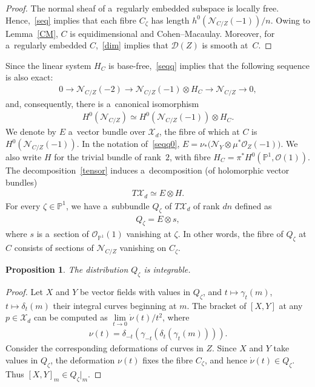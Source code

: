 \documentclass[pdftex]{sigma}
\numberwithin{equation}{section}
\newtheorem{Proposition}[Theorem]{Proposition}
{\theoremstyle{definition}
\newtheorem{Definition}[Theorem]{Definition}
\newtheorem{Remark}[Theorem]{Remark}
}
\begin{document}
\begin{proof}
The normal sheaf of a~regularly embedded subspace is locally free.
Hence,~\eqref{seq} implies that each f\/ibre $C_\zeta$ has length $h^0( {\mathcal{N}}_{C/Z}(-1))/n$.
Owing to Lemma~\ref{CM}, $C$ is equidimensional and Cohen--Macaulay.
Moreover, for a~regularly embedded $C$,~\eqref{dim} implies that ${\mathcal{D}}(Z)$ is smooth at~$C$.
\end{proof}

Since the linear system $H_C$ is base-free,~\eqref{seqq} implies that the following sequence is also exact:
\begin{gather*}
0\to {\mathcal{N}}_{C/Z}(-2)\to {\mathcal{N}}_{C/Z}(-1)\otimes H_C\to {\mathcal{N}}_{C/Z}\to 0,
\end{gather*}
and, consequently, there is a~canonical isomorphism
\begin{gather}
H^0({\mathcal{N}}_{C/Z})\simeq H^0({\mathcal{N}}_{C/Z}(-1))\otimes H_C.
\label{tensor}
\end{gather}
We denote by $E$ a~vector bundle over ${\mathcal{X}}_d$, the f\/ibre of which at $C$ is $H^0({\mathcal{N}}_{C/Z}(-1))$.
In the notation of~\eqref{seqq0}, $E= \nu_\ast\bigl({\mathcal{N}}_Y\otimes \mu^\ast{\mathcal{O}}_Z(-1)\bigr)$.
We also write $H$ for the trivial bundle of rank~$2$, with f\/ibre $H_C=\pi^\ast H^0({\mathbb{P}}^1,{\mathcal{O}}(1))$.
The decomposition~\eqref{tensor} induces a~decomposition (of holomorphic vector bundles)
\begin{gather*}
T{\mathcal{X}}_d\simeq E\otimes H.
\end{gather*}
For every $\zeta\in {\mathbb{P}}^1$, we have a~subbundle $Q_\zeta$ of $T{\mathcal{X}}_d$ of rank $dn$ def\/ined as
\begin{gather*}
Q_\zeta=E\otimes s,
\end{gather*}
where $s$ is a~section of ${\mathcal{O}}_{{\mathbb{P}}^1}(1)$ vanishing at $\zeta$.
In other words, the f\/ibre of $Q_\zeta$ at $C$ consists of sections of ${\mathcal{N}}_{C/Z}$ vanishing on $C_\zeta$.

\begin{Proposition}\label{integr}
The distribution $Q_\zeta$ is integrable.
\end{Proposition}

\begin{proof}
Let $X$ and $Y$ be vector f\/ields with values in $Q_\zeta$, and $t\mapsto\gamma_t(m)$, $t\mapsto \delta_t(m)$ their
integral curves beginning at $m$.
The bracket of $[X,Y]$ at any $p\in {\mathcal{X}}_d$ can be computed as $\lim\limits_{t\to 0}\dot\nu(t)/t^2$, where
\begin{gather*}
\nu(t)=\delta_{-t}(\gamma_{-t}(\delta_t(\gamma_t(m)))).
\end{gather*}
Consider the corresponding deformations of curves in $Z$.
Since $X$ and $Y$ take values in $Q_\zeta$, the deformation $\nu(t)$ f\/ixes the f\/ibre $C_\zeta$, and hence $\dot\nu(t)\in
Q_\zeta$.
Thus $[X,Y]_m\in {Q_\zeta}|_m$.
\end{proof}
\end{document}
